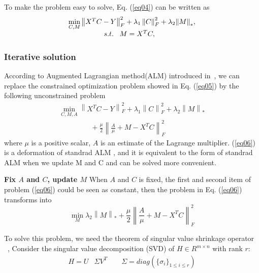 \documentclass{ieeeaccess}
\begin{document}
To make the problem easy to solve, Eq. (\ref{eq04}) can be written as
\begin{equation}\label{eq05}
\begin{array}{l}
\mathop {\min }\limits_{C ,M} \left\| {{X^T}C  - Y} \right\|_F^2 +{\lambda _1}\left\| C  \right\|_F^2 + {\lambda _2}{\left\| M \right\|_*},\\
 \;\;\;\;\;\;\;\;\;\;\;\;\;\;\;\;\;\;{\rm s.t.} \; \; \; M={X^T}C,
 \end{array}
\end{equation}



\subsubsection{Iterative solution}

According to Augmented Lagrangian method(ALM) introduced in~\cite{ref13}, we can replace the constrained optimization problem showed in Eq. (\ref{eq05}) by the following unconstrained problem
\begin{equation}\label{eq06}
\begin{array}{l}
\mathop {\min }\limits_{C ,M,A} \left\| {{X^T}C  - Y} \right\|_F^2 + {\lambda _1}\left\| C  \right\|_F^2 + {\lambda _2}{\left\| M \right\|_*}\\ \;\;\;\;\;\;\;\;\;\;\;\;\;\;\;\;+ \displaystyle\frac{\mu }{2}\left\| {\displaystyle\frac{A}{\mu } + M - {X^T}C } \right\|_F^2
\end{array}
\end{equation}
where $\mu$ is a positive scalar, $A$ is an estimate of the Lagrange multiplier. (\ref{eq06}) is a deformation of standrad ALM , and it is  equivalent to the form of standrad ALM when we update M and C and can be solved more convenient.

\textbf{Fix $A$ and $C$, update $M$} When $A$ and $C$ is fixed, the first and second item of problem (\ref{eq06}) could be seen as constant, then the problem in Eq. (\ref{eq06}) transforms into
\begin{equation}\label{eq07}
\mathop {\min }\limits_M {\lambda _2}{\left\| M \right\|_*} + \displaystyle\frac{\mu }{2}\left\| {\frac{A}{\mu } + M - {X^T}C } \right\|_F^2
\end{equation}






To solve this problem, we need the theorem of singular value shrinkage operator ~\cite{ref14}, Consider the singular value decomposition (SVD) of $H \in {R^{m \times n}}$ with rank $r$:
\begin{align}
H = U & \Sigma {V^T}  \qquad  \Sigma=diag({\{{\sigma _i}\} _{1 \le i \le r}})
\end{align}
\end{document}
